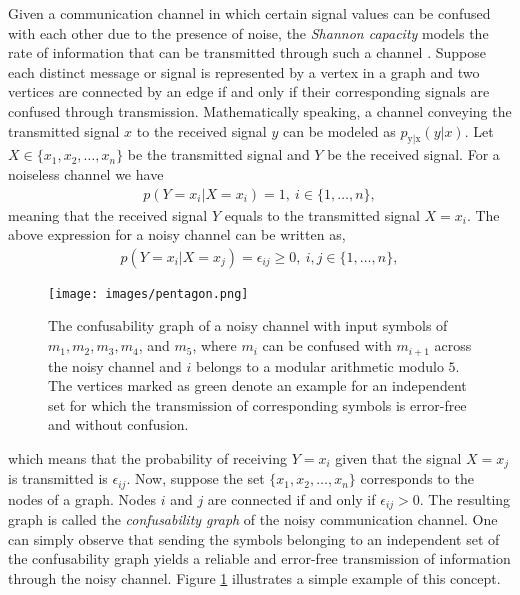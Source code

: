 \documentclass{article}
\begin{document}
Given a communication channel in which certain signal values can be confused with each other due to the presence of noise, the \textit{Shannon capacity} models the rate of information that can be transmitted through such a channel \cite{shannon}. Suppose each distinct message or signal is represented by a vertex in a graph and two vertices are connected by an edge if and only if their corresponding signals are confused through transmission. Mathematically speaking, a channel conveying the transmitted signal $x$ to the received signal $y$ can be modeled as $p_{\textrm{y}|\textrm{x}}(y|x)$. Let $X \in \{x_1, x_2, \dots, x_n\}$ be the transmitted signal and $Y$ be the received signal. For a noiseless channel we have
\begin{gather}
	p(Y=x_i|X=x_i) = 1,\ i \in \{1, \dots, n\},
\end{gather}
meaning that the received signal $Y$ equals to the transmitted signal $X=x_i$. The above expression for a noisy channel can be written as,
\begin{gather}
	p(Y=x_i|X=x_j) = \epsilon_{ij} \geq 0,\ i,j \in \{1,\dots,n\},
\end{gather}	
\begin{figure}[t]
	\begin{center}
		\centerline{\texttt{[image: images/pentagon.png]}}
		\caption{The confusability graph of a noisy channel with input symbols of $m_1, m_2, m_3, m_4$, and $m_5$, where $m_i$ can be confused with $m_{i+1}$ across the noisy channel and $i$ belongs to a modular arithmetic modulo $5$. The vertices marked as green denote an example for an independent set for which the transmission of corresponding symbols is error-free and without confusion.}
		\label{fig: pentagon}
	\end{center}
\end{figure}
which means that the probability of receiving $Y=x_i$ given that the signal $X=x_j$ is transmitted is $\epsilon_{ij}$. Now, suppose the set $\{x_1, x_2, \dots, x_n\}$ corresponds to the nodes of a graph. Nodes $i$ and $j$ are connected if and only if $\epsilon_{ij} > 0$. The resulting graph is called the \textit{confusability graph} of the noisy communication channel. One can simply observe that sending the symbols belonging to an independent set of the confusability graph yields a reliable and error-free transmission of information through the noisy channel. Figure \ref{fig: pentagon} illustrates a simple example of this concept.
\end{document}
